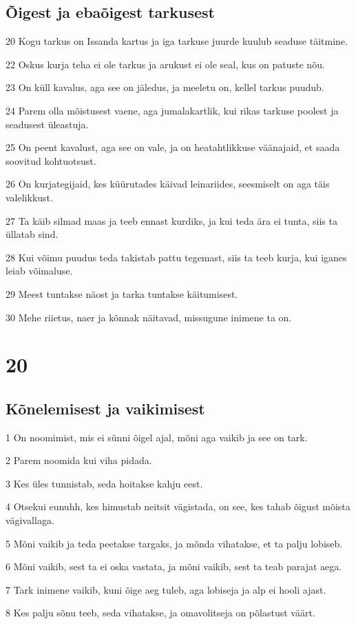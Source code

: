 \section*{Õigest ja ebaõigest tarkusest}

\par 20 Kogu tarkus on Issanda kartus ja iga tarkuse juurde kuulub seaduse täitmine.
\par 22 Oskus kurja teha ei ole tarkus ja arukust ei ole seal, kus on patuste nõu.
\par 23 On küll kavalus, aga see on jäledus, ja meeletu on, kellel tarkus puudub.
\par 24 Parem olla mõistusest vaene, aga jumalakartlik, kui rikas tarkuse poolest ja seadusest üleastuja.
\par 25 On peent kavalust, aga see on vale, ja on heatahtlikkuse väänajaid, et saada soovitud kohtuotsust.
\par 26 On kurjategijaid, kes küürutades käivad leinariides, seesmiselt on aga täis valelikkust.
\par 27 Ta käib silmad maas ja teeb ennast kurdiks, ja kui teda ära ei tunta, siis ta üllatab sind.
\par 28 Kui võimu puudus teda takistab pattu tegemast, siis ta teeb kurja, kui iganes leiab võimaluse.
\par 29 Meest tuntakse näost ja tarka tuntakse käitumisest.
\par 30 Mehe riietus, naer ja kõnnak näitavad, missugune inimene ta on.

\chapter{20}

\section*{Kõnelemisest ja vaikimisest}

\par 1 On noomimist, mis ei sünni õigel ajal, mõni aga vaikib ja see on tark.
\par 2 Parem noomida kui viha pidada.
\par 3 Kes üles tunnistab, seda hoitakse kahju eest.
\par 4 Otsekui eunuhh, kes himustab neitsit vägistada, on see, kes tahab õigust mõista vägivallaga.
\par 5 Mõni vaikib ja teda peetakse targaks, ja mõnda vihatakse, et ta palju lobiseb.
\par 6 Mõni vaikib, sest ta ei oska vastata, ja mõni vaikib, sest ta teab parajat aega.
\par 7 Tark inimene vaikib, kuni õige aeg tuleb, aga lobiseja ja alp ei hooli ajast.
\par 8 Kes palju sõnu teeb, seda vihatakse, ja omavolitseja on põlastust väärt.

